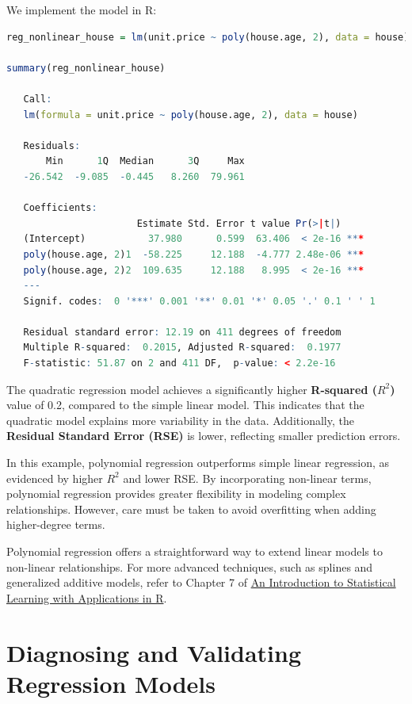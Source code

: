 \documentclass[
]{book}
\theoremstyle{definition}
\theoremstyle{definition}
\theoremstyle{definition}
\theoremstyle{definition}
\theoremstyle{remark}
\begin{document}
We implement the model in R:

\begin{lstlisting}[language=R]
reg_nonlinear_house = lm(unit.price ~ poly(house.age, 2), data = house)

summary(reg_nonlinear_house)
   
   Call:
   lm(formula = unit.price ~ poly(house.age, 2), data = house)
   
   Residuals:
       Min      1Q  Median      3Q     Max 
   -26.542  -9.085  -0.445   8.260  79.961 
   
   Coefficients:
                       Estimate Std. Error t value Pr(>|t|)    
   (Intercept)           37.980      0.599  63.406  < 2e-16 ***
   poly(house.age, 2)1  -58.225     12.188  -4.777 2.48e-06 ***
   poly(house.age, 2)2  109.635     12.188   8.995  < 2e-16 ***
   ---
   Signif. codes:  0 '***' 0.001 '**' 0.01 '*' 0.05 '.' 0.1 ' ' 1
   
   Residual standard error: 12.19 on 411 degrees of freedom
   Multiple R-squared:  0.2015, Adjusted R-squared:  0.1977 
   F-statistic: 51.87 on 2 and 411 DF,  p-value: < 2.2e-16
\end{lstlisting}

The quadratic regression model achieves a significantly higher \textbf{R-squared (\(R^2\))} value of 0.2, compared to the simple linear model. This indicates that the quadratic model explains more variability in the data. Additionally, the \textbf{Residual Standard Error (RSE)} is lower, reflecting smaller prediction errors.

In this example, polynomial regression outperforms simple linear regression, as evidenced by higher \(R^2\) and lower RSE. By incorporating non-linear terms, polynomial regression provides greater flexibility in modeling complex relationships. However, care must be taken to avoid overfitting when adding higher-degree terms.

Polynomial regression offers a straightforward way to extend linear models to non-linear relationships. For more advanced techniques, such as splines and generalized additive models, refer to Chapter 7 of \href{https://www.statlearning.com}{An Introduction to Statistical Learning with Applications in R}.

\section{Diagnosing and Validating Regression Models}\label{diagnosing-and-validating-regression-models}
\end{document}
